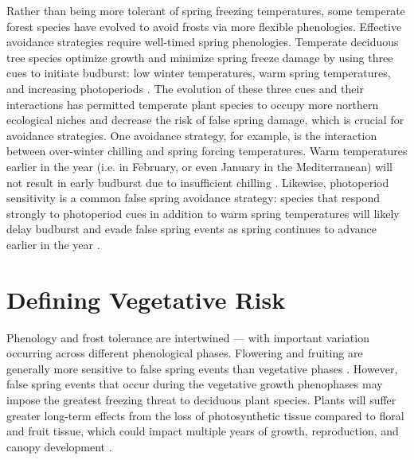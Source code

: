 \documentclass{article}\usepackage[]{graphicx}\usepackage[]{color}
\begin{document}
Rather than being more tolerant of spring freezing temperatures, some temperate forest species have evolved to avoid frosts via more flexible phenologies. Effective avoidance strategies require well-timed spring phenologies. Temperate deciduous tree species optimize growth and minimize spring freeze damage by using three cues to initiate budburst: low winter temperatures, warm spring temperatures, and increasing photoperiods \citep{Chuine2010}. The evolution of these three cues and their interactions has permitted temperate plant species to occupy more northern ecological niches \citep{Kollas2014} and decrease the risk of false spring damage, which is crucial for avoidance strategies. One avoidance strategy, for example, is the interaction between over-winter chilling and spring forcing temperatures. Warm temperatures earlier in the year (i.e. in February, or even January in the Mediterranean) will not result in early budburst due to insufficient chilling \citep{Basler2012}. Likewise, photoperiod sensitivity is a common false spring avoidance strategy: species that respond strongly to photoperiod cues in addition to warm spring temperatures will likely delay budburst and evade false spring events as spring continues to advance earlier in the year \citep{Basler2014}. 

\section {Defining Vegetative Risk} %
Phenology and frost tolerance are intertwined --- with important variation occurring across different phenological phases. Flowering and fruiting are generally more sensitive to false spring events than vegetative phases \citep{Augspurger2009, Lenz2013}.
However, false spring events that occur during the vegetative growth phenophases may impose the greatest freezing threat to deciduous plant species. Plants will suffer greater long-term effects from the loss of photosynthetic tissue compared to floral and fruit tissue, which could impact multiple years of growth, reproduction, and canopy development \citep{Sakai1987, Vitasse2014}. 
\end{document}
